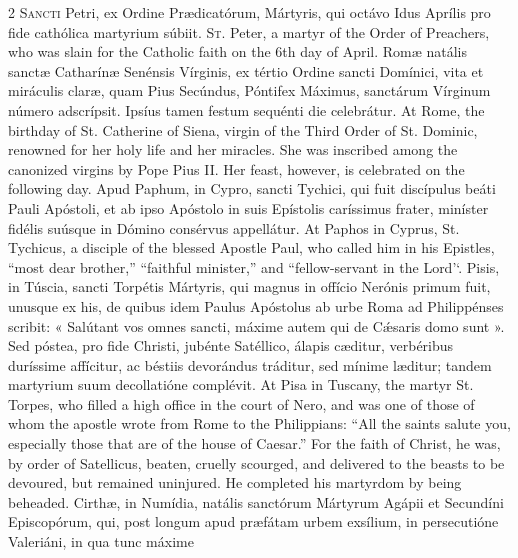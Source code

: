 \begin{paracol}{2}
\lettrine[lines=2]{S}{ancti} Petri, ex 
 Ordine Prædicatórum, Mártyris, qui octávo Idus Aprílis pro fide cathólica 
 martyrium súbiit.
\switchcolumn
{}
\lettrine[lines=2]{S}{t.} Peter, a martyr of the Order of 
 Preachers, who was slain for the Catholic faith on the 6th day of April.
\switchcolumn*
{}
Romæ natális sanctæ 
 Catharínæ Senénsis Vírginis, ex tértio Ordine sancti Domínici, vita et 
 miráculis claræ, quam Pius Secúndus, Póntifex Máximus, sanctárum Vírginum 
 número adscrípsit. Ipsíus tamen festum sequénti die celebrátur.
\switchcolumn
{}
At Rome, the birthday of St. 
 Catherine of Siena, virgin of the Third Order of St. Dominic, renowned for 
 her holy life and her miracles. She was inscribed among the canonized 
 virgins by Pope Pius II. Her feast, however, is celebrated on the 
 following day.
\switchcolumn*
{}
Apud Paphum, in Cypro, 
 sancti Tychici, qui fuit discípulus beáti Pauli Apóstoli, et ab ipso 
 Apóstolo in suis Epístolis caríssimus frater, miníster fidélis suúsque in 
 Dómino consérvus appellátur.
\switchcolumn
{}
At Paphos in Cyprus, St. Tychicus, 
 a disciple of the blessed Apostle Paul, who called him in his Epistles, 
 ``most dear brother,'' ``faithful minister,'' and ``fellow-servant in the Lord'`.
\switchcolumn*
{}
Pisis, in Túscia, 
 sancti Torpétis Mártyris, qui magnus in offício Nerónis primum fuit, unusque 
 ex his, de quibus idem Paulus Apóstolus ab urbe Roma ad Philippénses scribit: 
 « Salútant vos omnes sancti, máxime autem qui de Cǽsaris domo sunt ». 
 Sed póstea, pro fide Christi, jubénte Satéllico, 
 álapis cæditur, verbéribus 
 duríssime affícitur, ac béstiis devorándus tráditur, sed mínime læditur; 
 tandem martyrium suum decollatióne complévit.
\switchcolumn
{}
At Pisa in Tuscany, the martyr St. 
 Torpes, who filled a high office in the court of Nero, and was one of those 
 of whom the apostle wrote from Rome to the Philippians: ``All the saints 
 salute you, especially those that are of the house of Caesar.'' For the 
 faith of Christ, he was, by order of Satellicus, beaten, cruelly scourged, 
 and delivered to the beasts to be devoured, but remained uninjured. He 
 completed his martyrdom by being beheaded.
\switchcolumn*
{}
Cirthæ, in Numídia, 
 natális sanctórum Mártyrum Agápii et Secundíni Episcopórum, qui, post longum 
 apud præfátam urbem exsílium, in persecutióne Valeriáni, in qua tunc máxime 

\end{paracol}
